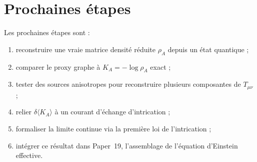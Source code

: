 \documentclass[11pt,a4paper]{article}
\begin{document}
\appendix

\section{Prochaines étapes}

Les prochaines étapes sont :

\begin{enumerate}
    \item reconstruire une vraie matrice densité réduite \(\rho_A\) depuis un état quantique ;
    \item comparer le proxy graphe à \(K_A=-\log\rho_A\) exact ;
    \item tester des sources anisotropes pour reconstruire plusieurs composantes de \(T_{\mu\nu}\) ;
    \item relier \(\delta\langle K_A\rangle\) à un courant d'échange d'intrication ;
    \item formaliser la limite continue via la première loi de l'intrication ;
    \item intégrer ce résultat dans Paper~19, l'assemblage de l'équation d'Einstein effective.
\end{enumerate}
\end{document}
